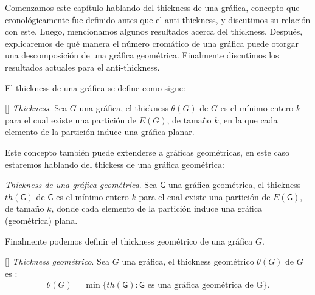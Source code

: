 

Comenzamos este capítulo hablando del thickness de una gráfica, concepto que
cronológicamente fue definido antes que el anti-thickness, y discutimos su
relación con este. Luego, mencionamos algunos resultados acerca
del thickness. Después, explicaremos de qué manera el número cromático de una
gráfica puede otorgar una descomposición de una gráfica geométrica. Finalmente
discutimos los resultados actuales para el anti-thickness.

El thickness de una gráfica se define como sigue:
\begin{definition}{[\cite{Dillencourt2004}] \emph{Thickness}.}
  Sea $G$ una gráfica, el thickness $\theta(G)$ de $G$ es el mínimo entero $k$
  para el cual existe una partición de $E(G)$, de tamaño $k$, en la que cada
  elemento de la partición induce una gráfica planar.
\end{definition}
Este concepto también puede extenderse a gráficas geométricas, en este caso
estaremos hablando del thickess de una gráfica geométrica:
\begin{definition}{\emph{Thickness de una gráfica geométrica}.}
  Sea $\mathsf{G}$ una gráfica geométrica, el thickness $th(\mathsf{G})$
  de $\mathsf{G}$ es el mínimo entero $k$ para el cual existe una partición de $E(\mathsf{G})$,
  de tamaño $k$, donde cada elemento de la partición induce una
  gráfica (geométrica) plana.
\end{definition}
Finalmente podemos definir el thickness geométrico de una gráfica $G$.
\begin{definition}{[\cite{Dillencourt2004}] \emph{Thickness geométrico}.}
  Sea $G$ una gráfica, el thickness geométrico $\bar{\theta}(G)$ de $G$
  es : \[ \bar{\theta}(G) = \min\{th(\mathsf{G}): \mathsf{G} \text{ es una gráfica geométrica de G} \} .\]
\end{definition}

